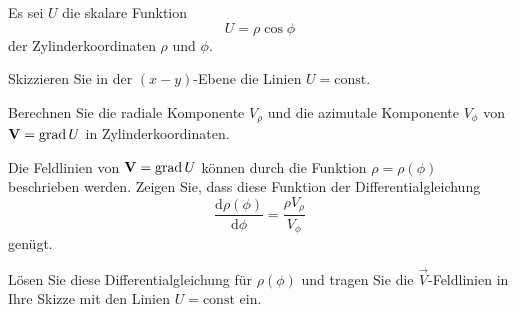 \begin{atiTask}[
  title = Zylinderkoordinaten und Feldlinien
]

Es sei $U$ die skalare Funktion
\[
U=\rho\cos\phi
\]
der Zylinderkoordinaten $\rho$ und $\phi$.
\begin{atiSubtasks}
	\item Skizzieren Sie in der $(x-y)$-Ebene die Linien $U=\text{const}$.
	\item Berechnen Sie die radiale Komponente $V_\rho$ und die azimutale Komponente $V_\phi$ von $\mathbf{V}=\operatorname{grad}{U}$ in Zylinderkoordinaten.
	\item Die Feldlinien von $\mathbf{V}=\operatorname{grad}{U}$ können durch die Funktion $\rho=\rho(\phi)$ beschrieben werden. Zeigen Sie, dass diese Funktion der Differentialgleichung 
	\[
	\frac{\mathrm{d} \rho (\phi)}{\mathrm{d} \phi}=\frac{\rho V_\rho}{V_\phi}
	\]
	genügt.
	\item Lösen Sie diese Differentialgleichung für $\rho(\phi)$ und tragen Sie die $\vec{V}$-Feldlinien in Ihre Skizze mit den Linien $U=\text{const}$ ein.
\end{atiSubtasks}

\end{atiTask}

\begin{atiSolution}
	
\end{atiSolution}